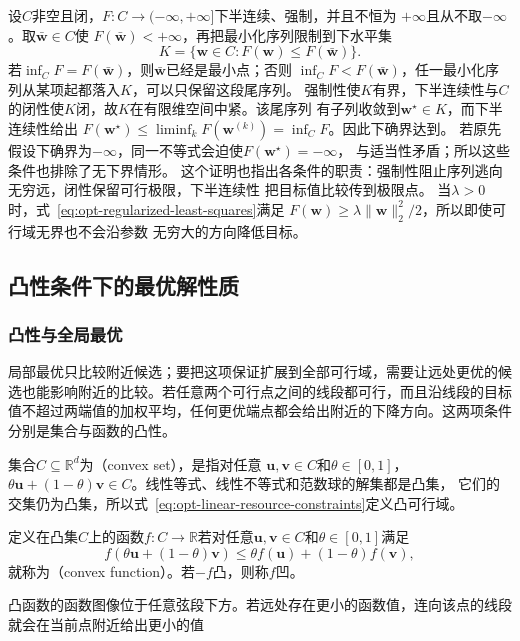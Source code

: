 设$C$非空且闭，$F:C\to(-\infty,+\infty]$下半连续、强制，并且不恒为
$+\infty$且从不取$-\infty$。取$\bar{\bm{w}}\in C$使
$F(\bar{\bm{w}})<+\infty$，再把最小化序列限制到下水平集
\[
  K=\{\bm{w}\in C:F(\bm{w})\leq F(\bar{\bm{w}})\}.
\]
若$\inf_C F=F(\bar{\bm{w}})$，则$\bar{\bm{w}}$已经是最小点；否则
$\inf_C F<F(\bar{\bm{w}})$，任一最小化序列从某项起都落入$K$，可以只保留这段尾序列。
强制性使$K$有界，下半连续性与$C$的闭性使$K$闭，故$K$在有限维空间中紧。该尾序列
有子列收敛到$\bm{w}^{\star}\in K$，而下半连续性给出
$F(\bm{w}^{\star})\leq\liminf_kF(\bm{w}^{(k)})=\inf_C F$。因此下确界达到。
若原先假设下确界为$-\infty$，同一不等式会迫使$F(\bm w^\star)=-\infty$，
与适当性矛盾；所以这些条件也排除了无下界情形。
这个证明也指出各条件的职责：强制性阻止序列逃向无穷远，闭性保留可行极限，下半连续性
把目标值比较传到极限点。
当$\lambda>0$时，式~\eqref{eq:opt-regularized-least-squares}满足
$F(\bm{w})\geq\lambda\lVert\bm{w}\rVert_2^2/2$，所以即使可行域无界也不会沿参数
无穷大的方向降低目标。

\subsection{凸性条件下的最优解性质}
\label{sec:opt-convexity}

\subsubsection{凸性与全局最优}

局部最优只比较附近候选；要把这项保证扩展到全部可行域，需要让远处更优的候选也能影响附近的比较。若任意两个可行点之间的线段都可行，而且沿线段的目标值不超过两端值的加权平均，任何更优端点都会给出附近的下降方向。这两项条件分别是集合与函数的凸性。
\begin{definition}[凸集与凸函数]
\label{def:opt-convex-set-function}
集合$C\subseteq\mathbb R^d$为（convex set），是指对任意
$\bm{u},\bm{v}\in C$和$\theta\in[0,1]$，
$\theta\bm{u}+(1-\theta)\bm{v}\in C$。线性等式、线性不等式和范数球的解集都是凸集，
它们的交集仍为凸集，所以式~\eqref{eq:opt-linear-resource-constraints}定义凸可行域。

定义在凸集$C$上的函数$f:C\to\mathbb R$若对任意$\bm u,\bm v\in C$和$\theta\in[0,1]$满足
\begin{equation}
  f(\theta\bm{u}+(1-\theta)\bm{v})
  \leq
  \theta f(\bm{u})+(1-\theta)f(\bm{v}),
  \label{eq:opt-convex-function}
\end{equation}
就称为（convex function）。若$-f$凸，则称$f$凹。
\end{definition}
凸函数的函数图像位于任意弦段下方。若远处存在更小的函数值，连向该点的线段就会在当前点附近给出更小的值

